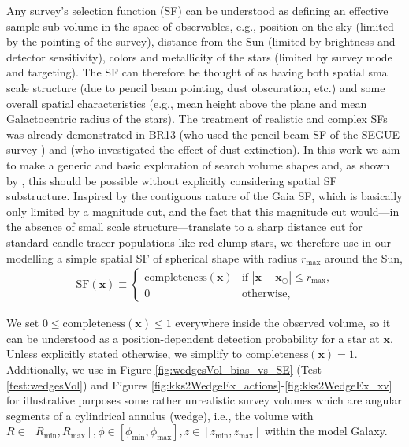 \documentclass[iop,revtex4,numberedappendix,appendixfloats]{emulateapj}
\newcommand{\vect}[1]{\boldsymbol{#1}}
\begin{document}
Any survey's selection function (SF) can be understood as defining an effective sample sub-volume in the space of observables, e.g., position on the sky (limited by the pointing of the survey), distance from the Sun (limited by brightness and detector sensitivity), colors and metallicity of the stars (limited by survey mode and targeting). The SF can therefore be thought of as having both spatial small scale structure (due to pencil beam pointing, dust obscuration, etc.) and some overall spatial characteristics (e.g., mean height above the plane and mean Galactocentric radius of the stars). The treatment of realistic and complex SFs was already demonstrated in BR13 (who used the pencil-beam SF of the SEGUE survey \citep{2012ApJ...753..148B}) and \citet{2016ApJ...818..130B} (who investigated the effect of dust extinction). In this work we aim to make a generic and basic exploration of search volume shapes and, as shown by \citet{2016ApJ...818..130B}, this should be possible without explicitly considering spatial SF substructure. Inspired by the contiguous nature of the Gaia SF, which is basically only limited by a magnitude cut, and the fact that this magnitude cut would---in the absence of small scale structure---translate to a sharp distance cut for standard candle tracer populations like red clump stars, we therefore use in our modelling a simple spatial SF of spherical shape with radius $r_\text{max}$ around the Sun,
\begin{eqnarray}
\text{SF}(\vect{x}) \equiv \begin{cases}
\text{completeness}(\vect{x}) &\text{if $|\vect{x}-\vect{x}_\odot| \leq r_\text{max}$,}\\
0 & \text{otherwise,}
\end{cases} \label{eq:selectionfunction}
\end{eqnarray}

We set $0 \leq \text{completeness}(\vect{x}) \leq 1$ everywhere inside the observed volume, so it can be understood as a position-dependent detection probability for a star at $\vect{x}$. Unless explicitly stated otherwise, we simplify to $\text{completeness}(\vect{x}) = 1$. Additionally, we use in Figure \ref{fig:wedgesVol_bias_vs_SE} (Test \ref{test:wedgesVol}) and Figures \ref{fig:kks2WedgeEx_actions}-\ref{fig:kks2WedgeEx_xv} for illustrative purposes some rather unrealistic survey volumes which are angular segments of a cylindrical annulus (wedge), i.e., the volume with $R \in [R_\text{min},R_\text{max}],\phi \in [\phi_\text{min},\phi_\text{max}],z \in [z_\text{min},z_\text{max}]$ within the model Galaxy. 

\end{document}
